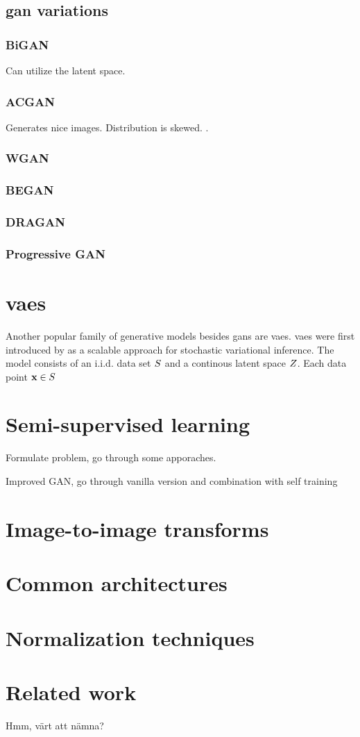 \subsection{\acrshort{gan} variations}
\subsubsection{BiGAN}
Can utilize the latent space.
\subsubsection{ACGAN}
Generates nice images. \textcite{odena2016conditional} Distribution is skewed. \textcite{shuac2017acganisbad}.
\subsubsection{WGAN}
\subsubsection{BEGAN}
\subsubsection{DRAGAN}
\subsubsection{Progressive GAN}

\section{\acrlong{vaes}}
Another popular family of generative models besides \acrshort{gans} are \acrfull{vaes}. \acrlong{vaes} were first introduced by \textcite{kingma2013auto} as a scalable approach for stochastic variational inference. The model consists of an i.i.d. data set $S$ and a continous latent space $Z$. Each data point $\mathbf{x} \in S$ 

\section{Semi-supervised learning}
Formulate problem, go through some apporaches.

Improved GAN, go through vanilla version and combination with self training

\section{Image-to-image transforms}

\section{Common architectures}

\section{Normalization techniques}

\section{Related work}
Hmm, värt att nämna? 






